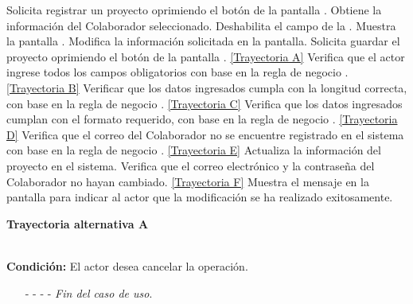 	\begin{UCtrayectoria}
		\UCpaso[\UCactor] Solicita registrar un proyecto oprimiendo el botón \editar de la pantalla .
		\UCpaso[\UCsist] Obtiene la información del Colaborador seleccionado.
		\UCpaso[\UCsist] Deshabilita el campo de la .
		\UCpaso[\UCsist] Muestra la pantalla .
		\UCpaso[\UCactor] Modifica la información solicitada en la pantalla. \label{CU3.2-P5}
		\UCpaso[\UCactor] Solicita guardar el proyecto oprimiendo el botón  de la pantalla . \hyperlink{CU3-2:TAA}{[Trayectoria A]}
		\UCpaso[\UCsist] Verifica que el actor ingrese todos los campos obligatorios con base en la regla de negocio . \hyperlink{CU3-2:TAB}{[Trayectoria B]}
		\UCpaso[\UCsist] Verificar que los datos ingresados cumpla con la longitud correcta, con base en la regla de negocio . \hyperlink{CU3-2:TAC}{[Trayectoria C]} 
		\UCpaso[\UCsist] Verifica que los datos ingresados cumplan con el formato requerido, con base en la regla de negocio . \hyperlink{CU3-2:TAD}{[Trayectoria D]} 
		\UCpaso[\UCsist] Verifica que el correo del Colaborador no se encuentre registrado en el sistema con base en la regla de negocio . \hyperlink{CU3-2:TAE}{[Trayectoria E]}\label{CU3.2-P10}
		\UCpaso[\UCsist] Actualiza la información del proyecto en el sistema.
		\UCpaso[\UCsist] Verifica que el correo electrónico y la contraseña del Colaborador no hayan cambiado. \hyperlink{CU3-2:TAF}{[Trayectoria F]}
		\UCpaso[\UCsist] Muestra el mensaje  en la pantalla  para indicar al actor que la modificación se ha realizado exitosamente. 
	\end{UCtrayectoria}		
	\hypertarget{CU3-2:TAA}{\textbf{Trayectoria alternativa A}}\\
	\noindent \textbf{Condición:} El actor desea cancelar la operación.
	\begin{enumerate}
		\UCpaso[\UCactor] Solicita cancelar la operación oprimiendo el botón  de la pantalla .
		\UCpaso[\UCsist] Muestra la pantalla .
		\item[- -] - - {\em {Fin del caso de uso}}.%
	\end{enumerate}
